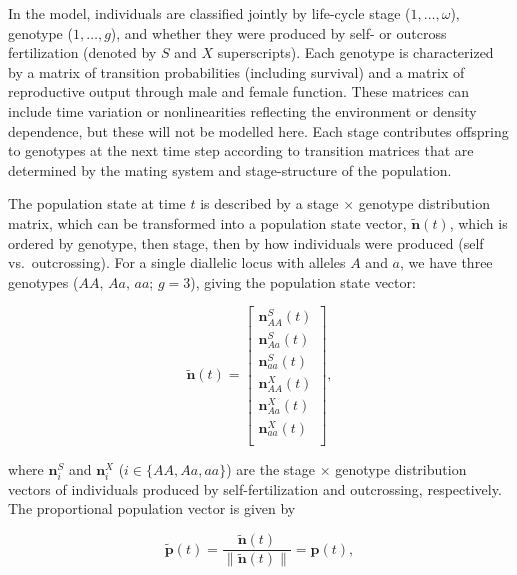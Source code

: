 \documentclass[11pt]{article}
\def\mbf#1{\mathbf{#1}}
\begin{document}
In the model, individuals are classified jointly by life-cycle stage ($1, \ldots, \omega$), genotype ($1, \ldots, g$), and whether they were produced by self- or outcross fertilization (denoted by $S$ and $X$ superscripts). Each genotype is characterized by a matrix of transition probabilities (including survival) and a matrix of reproductive output through male and female function. These matrices can include time variation or nonlinearities reflecting the environment or density dependence, but these will not be modelled here. Each stage contributes offspring to genotypes at the next time step according to transition matrices that are determined by the mating system and stage-structure of the population.

The population state at time $t$ is described by a stage $\times$ genotype distribution matrix, which can be transformed into a population state vector, $\tilde{\mbf{n}}(t)$, which is ordered by genotype, then stage, then by how individuals were produced (self vs.~outcrossing). For a single diallelic locus with alleles $A$ and $a$, we have three genotypes ($AA,\, Aa,\, aa$; $g = 3$), giving the population state vector:
\begin{linenomath*}
\begin{equation}
	\tilde{\mbf{n}}(t) =  \left[
								\begin{array}{c}
									\mbf{n}^{S}_{AA}(t) \\
									\mbf{n}^{S}_{Aa}(t) \\
									\mbf{n}^{S}_{aa}(t) \\ \hline
									\mbf{n}^{X}_{AA}(t) \\
									\mbf{n}^{X}_{Aa}(t) \\
									\mbf{n}^{X}_{aa}(t) \\ 
						\end{array} \right],
\end{equation}
\end{linenomath*}

\noindent where $\mbf{n}^{S}_{i}$ and $\mbf{n}^{X}_{i}$ ($i \in \{AA,Aa,aa\}$) are the stage $\times$ genotype distribution vectors of individuals produced by self-fertilization and outcrossing, respectively. The proportional population vector is given by
\begin{linenomath*}
\begin{equation} \label{eq:propPopVec}
	\tilde{\mbf{p}}(t) = \frac{\tilde{\mbf{n}}(t)}{ \| \tilde{\mbf{n}}(t) \|} = \mbf{p}(t),
\end{equation}
\end{linenomath*}
\end{document}
